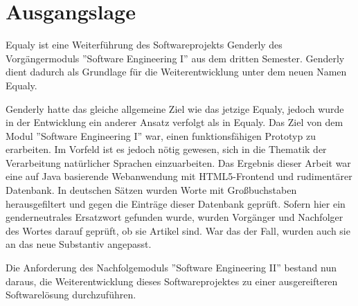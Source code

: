 \section{Ausgangslage}
\label{sec:ausgangslage}



Equaly ist eine Weiterführung des Softwareprojekts Genderly des Vorgängermoduls ''Software Engineering I'' aus dem dritten Semester. Genderly dient dadurch als Grundlage für die Weiterentwicklung unter dem neuen Namen Equaly.

Genderly hatte das gleiche allgemeine Ziel wie das jetzige Equaly, jedoch wurde in der Entwicklung ein anderer Ansatz verfolgt als in Equaly. Das Ziel von dem Modul ''Software Engineering I'' war, einen funktionsfähigen Prototyp zu erarbeiten. Im Vorfeld ist es jedoch nötig gewesen, sich in die Thematik der Verarbeitung natürlicher Sprachen einzuarbeiten. Das Ergebnis dieser Arbeit war eine auf Java basierende Webanwendung mit HTML5-Frontend und rudimentärer Datenbank. In deutschen Sätzen wurden Worte mit Großbuchstaben herausgefiltert und gegen die Einträge dieser Datenbank geprüft. Sofern hier ein genderneutrales Ersatzwort gefunden wurde, wurden Vorgänger und Nachfolger des Wortes darauf geprüft, ob sie Artikel sind. War das der Fall, wurden auch sie an das neue Substantiv angepasst.

Die Anforderung des Nachfolgemoduls ''Software Engineering II'' bestand nun daraus, die Weiterentwicklung dieses Softwareprojektes zu einer ausgereifteren Softwarelösung durchzuführen.